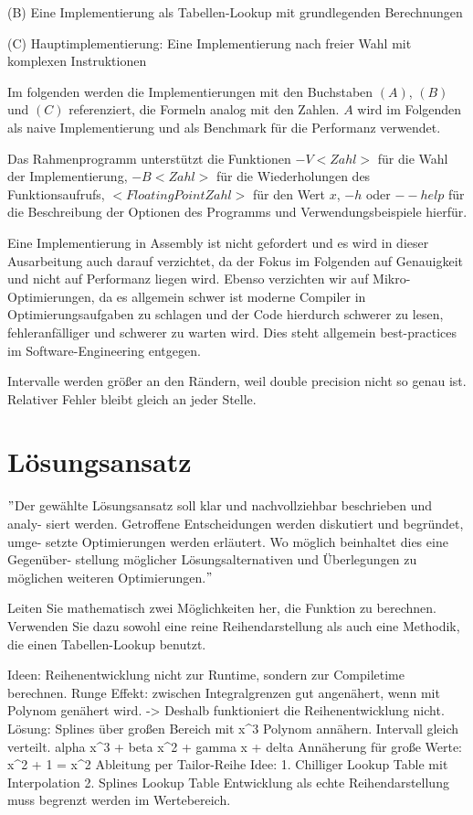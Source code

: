 \documentclass[course=erap]{aspdoc}
\begin{document}
    (B) Eine Implementierung als Tabellen-Lookup mit grundlegenden Berechnungen


    (C) Hauptimplementierung: Eine Implementierung nach freier Wahl mit komplexen Instruktionen


    Im folgenden werden die Implementierungen mit den Buchstaben $(A)$, $(B)$ und $(C)$ referenziert, die Formeln analog mit den Zahlen.
    $A$ wird im Folgenden als naive Implementierung und als Benchmark für die Performanz verwendet.


    Das Rahmenprogramm unterstützt die Funktionen $-V<Zahl>$ für die Wahl der Implementierung, $-B<Zahl>$ für die Wiederholungen des Funktionsaufrufs, $<Floating Point Zahl>$ für den Wert $x$, $-h$ oder $--help$ für die Beschreibung der Optionen des Programms und Verwendungsbeispiele hierfür.


    Eine Implementierung in Assembly ist nicht gefordert und es wird in dieser Ausarbeitung auch darauf verzichtet, da der Fokus im Folgenden auf Genauigkeit und nicht auf Performanz liegen wird.
    Ebenso verzichten wir auf Mikro-Optimierungen, da es allgemein schwer ist moderne Compiler in Optimierungsaufgaben zu schlagen und der Code hierdurch schwerer zu lesen, fehleranfälliger und schwerer zu warten wird.
    Dies steht allgemein best-practices im Software-Engineering entgegen.

    Intervalle werden größer an den Rändern, weil double precision nicht so genau ist.
    Relativer Fehler bleibt gleich an jeder Stelle.


    \section{Lösungsansatz}
    \("\)Der gewählte Lösungsansatz soll klar und nachvollziehbar beschrieben und analy- siert werden.
    Getroffene Entscheidungen werden diskutiert und begründet, umge- setzte Optimierungen werden erläutert.
    Wo möglich beinhaltet dies eine Gegenüber- stellung möglicher Lösungsalternativen und Überlegungen zu möglichen weiteren Optimierungen.\("\)

    Leiten Sie mathematisch zwei Möglichkeiten her, die Funktion zu berechnen.
    Verwenden Sie dazu sowohl eine reine Reihendarstellung als auch eine Methodik, die einen Tabellen-Lookup benutzt.

    Ideen: Reihenentwicklung nicht zur Runtime, sondern zur Compiletime berechnen.
    Runge Effekt: zwischen Integralgrenzen gut angenähert, wenn mit Polynom genähert wird. -> Deshalb funktioniert die Reihenentwicklung nicht.
    Lösung: Splines über großen Bereich mit x^3 Polynom annähern. Intervall gleich verteilt. alpha x^3 + beta x^2 + gamma x + delta
    Annäherung für große Werte: x^2 + 1 = x^2
    Ableitung per Tailor-Reihe
    Idee: 1. Chilliger Lookup Table mit Interpolation 2. Splines Lookup Table
    Entwicklung als echte Reihendarstellung muss begrenzt werden im Wertebereich.
\end{document}
